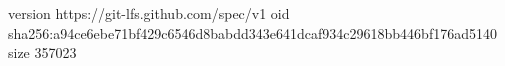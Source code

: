 version https://git-lfs.github.com/spec/v1
oid sha256:a94ce6ebe71bf429c6546d8babdd343e641dcaf934c29618bb446bf176ad5140
size 357023
